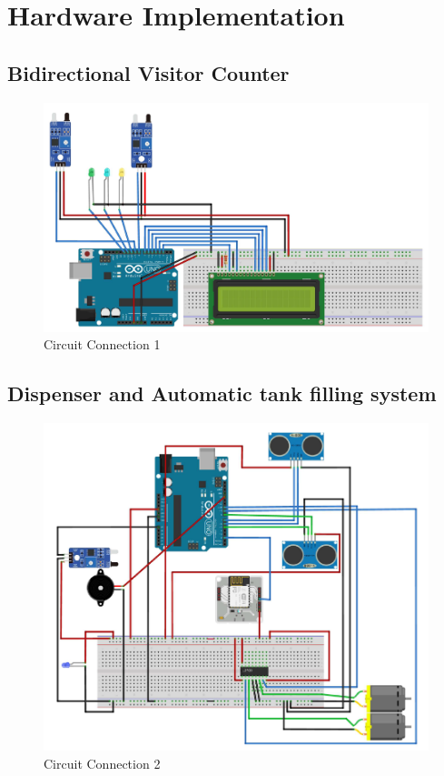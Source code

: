 
\chapter{Hardware Implementation}


\section{Bidirectional Visitor Counter}

   \begin{figure}[h]
		\centering
	\includegraphics[width=140mm,scale=1]{circuit1}
	\caption{Circuit Connection 1}
	\label{Bidirectional Visitor Counter}
\end{figure}


\newpage
\section{Dispenser and Automatic tank filling system}

   \begin{figure}[h]
		\centering
	\includegraphics[width=140mm,scale=1]{circuit2}
	\caption{Circuit Connection 2}
	\label{Bidirectional Visitor Counter}
\end{figure}